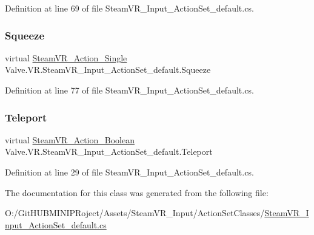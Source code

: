 Definition at line 69 of file Steam\+V\+R\+\_\+\+Input\+\_\+\+Action\+Set\+\_\+default.\+cs.

\mbox{\label{class_valve_1_1_v_r_1_1_steam_v_r___input___action_set__default_a7143c3825b03e674cfbcb81321a4e0ea}} 
\subsubsection{\texorpdfstring{Squeeze}{Squeeze}}
{\footnotesize\ttfamily virtual \mbox{\hyperlink{class_valve_1_1_v_r_1_1_steam_v_r___action___single}{Steam\+V\+R\+\_\+\+Action\+\_\+\+Single}} Valve.\+V\+R.\+Steam\+V\+R\+\_\+\+Input\+\_\+\+Action\+Set\+\_\+default.\+Squeeze\hspace{0.3cm}{\ttfamily [get]}}



Definition at line 77 of file Steam\+V\+R\+\_\+\+Input\+\_\+\+Action\+Set\+\_\+default.\+cs.

\mbox{\label{class_valve_1_1_v_r_1_1_steam_v_r___input___action_set__default_aeb825a25fa8bde6250fb0e734d3fad40}} 
\subsubsection{\texorpdfstring{Teleport}{Teleport}}
{\footnotesize\ttfamily virtual \mbox{\hyperlink{class_valve_1_1_v_r_1_1_steam_v_r___action___boolean}{Steam\+V\+R\+\_\+\+Action\+\_\+\+Boolean}} Valve.\+V\+R.\+Steam\+V\+R\+\_\+\+Input\+\_\+\+Action\+Set\+\_\+default.\+Teleport\hspace{0.3cm}{\ttfamily [get]}}



Definition at line 29 of file Steam\+V\+R\+\_\+\+Input\+\_\+\+Action\+Set\+\_\+default.\+cs.



The documentation for this class was generated from the following file\+:\begin{DoxyCompactItemize}
\item 
O\+:/\+Git\+H\+U\+B\+M\+I\+N\+I\+P\+Roject/\+Assets/\+Steam\+V\+R\+\_\+\+Input/\+Action\+Set\+Classes/\mbox{\hyperlink{_steam_v_r___input___action_set__default_8cs}{Steam\+V\+R\+\_\+\+Input\+\_\+\+Action\+Set\+\_\+default.\+cs}}\end{DoxyCompactItemize}

